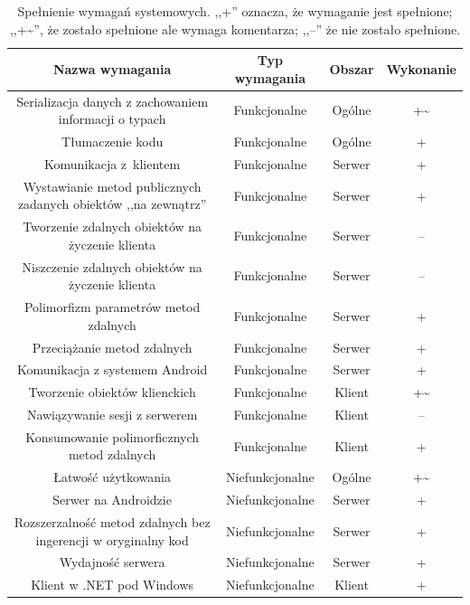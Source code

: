 \begin{table}[htbp]
	\centering
		\begin{tabular}{ | c | c | c | c | }
			\hline
				\textbf{Nazwa wymagania} & \textbf{Typ wymagania} & \textbf{Obszar} & \textbf{Wykonanie}\\
				\hline \hline
				Serializacja danych z zachowaniem informacji o typach & Funkcjonalne & Ogólne & +\textasciitilde\\
				\hline
				Tłumaczenie kodu & Funkcjonalne & Ogólne & +\\
				\hline
				
				Komunikacja z~klientem & Funkcjonalne & Serwer & +\\
				\hline
				Wystawianie metod publicznych zadanych obiektów ,,na zewnątrz'' & Funkcjonalne & Serwer & + \\
				\hline
				Tworzenie zdalnych obiektów na życzenie klienta & Funkcjonalne & Serwer & -- \\
				\hline
				Niszczenie zdalnych obiektów na życzenie klienta & Funkcjonalne & Serwer & -- \\
				\hline
				Polimorfizm parametrów metod zdalnych & Funkcjonalne & Serwer & + \\
				\hline
				Przeciążanie metod zdalnych & Funkcjonalne & Serwer & + \\
				\hline
				Komunikacja z systemem Android & Funkcjonalne & Serwer & + \\
				\hline
				
				Tworzenie obiektów klienckich & Funkcjonalne & Klient & +\textasciitilde \\
				\hline
				Nawiązywanie sesji z serwerem & Funkcjonalne & Klient & -- \\
				\hline
				Konsumowanie polimorficznych metod zdalnych & Funkcjonalne & Klient & + \\
				\hline
				
				Łatwość użytkowania & Niefunkcjonalne & Ogólne & +\textasciitilde \\
				\hline
				Serwer na Androidzie & Niefunkcjonalne & Serwer & + \\
				\hline
				Rozszerzalność metod zdalnych bez ingerencji w oryginalny kod & Niefunkcjonalne & Serwer & + \\
				\hline
				Wydajność serwera & Niefunkcjonalne & Serwer & + \\
				\hline
				Klient w .NET pod Windows & Niefunkcjonalne & Klient & + \\
				\hline
		\end{tabular}
	\caption[Spełnienie wymagań systemowych.]{Spełnienie wymagań systemowych. ,,+'' oznacza, że wymaganie jest spełnione; ,,+\textasciitilde'', że zostało spełnione ale wymaga komentarza; ,,--'' że nie zostało spełnione.}
	\label{tab:requirements-fulfilment}
\end{table}

